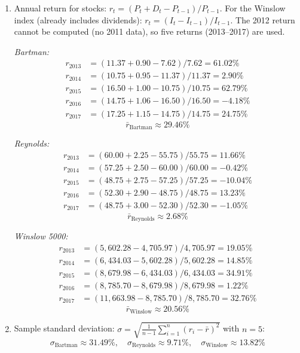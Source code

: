 \documentclass[11pt]{article}
\begin{document}
\begin{enumerate}
  \item[a.] Annual return for stocks: $r_t = (P_t + D_t - P_{t-1}) / P_{t-1}$. For the Winslow index (already includes dividends): $r_t = (I_t - I_{t-1}) / I_{t-1}$. The 2012 return cannot be computed (no 2011 data), so five returns (2013--2017) are used.

    \medskip

    \textit{Bartman:}
    \begin{align*}
      r_{2013} &= (11.37+0.90-7.62)/7.62 = 61.02\%\\
      r_{2014} &= (10.75+0.95-11.37)/11.37 = 2.90\%\\
      r_{2015} &= (16.50+1.00-10.75)/10.75 = 62.79\%\\
      r_{2016} &= (14.75+1.06-16.50)/16.50 = -4.18\%\\
      r_{2017} &= (17.25+1.15-14.75)/14.75 = 24.75\%
    \end{align*}
    \[
      \boxed{\bar{r}_{\text{Bartman}} \approx 29.46\%}
    \]

    \textit{Reynolds:}
    \begin{align*}
      r_{2013} &= (60.00+2.25-55.75)/55.75 = 11.66\%\\
      r_{2014} &= (57.25+2.50-60.00)/60.00 = -0.42\%\\
      r_{2015} &= (48.75+2.75-57.25)/57.25 = -10.04\%\\
      r_{2016} &= (52.30+2.90-48.75)/48.75 = 13.23\%\\
      r_{2017} &= (48.75+3.00-52.30)/52.30 = -1.05\%
    \end{align*}
    \[
      \boxed{\bar{r}_{\text{Reynolds}} \approx 2.68\%}
    \]

    \textit{Winslow 5000:}
    \begin{align*}
      r_{2013} &= (5{,}602.28-4{,}705.97)/4{,}705.97 = 19.05\%\\
      r_{2014} &= (6{,}434.03-5{,}602.28)/5{,}602.28 = 14.85\%\\
      r_{2015} &= (8{,}679.98-6{,}434.03)/6{,}434.03 = 34.91\%\\
      r_{2016} &= (8{,}785.70-8{,}679.98)/8{,}679.98 = 1.22\%\\
      r_{2017} &= (11{,}663.98-8{,}785.70)/8{,}785.70 = 32.76\%
    \end{align*}
    \[
      \boxed{\bar{r}_{\text{Winslow}} \approx 20.56\%}
    \]

  \item[b.] Sample standard deviation: $\sigma = \sqrt{\frac{1}{n-1}\sum_{i=1}^{n}(r_i-\bar{r})^2}$ with $n=5$:
    \[
      \boxed{\sigma_{\text{Bartman}} \approx 31.49\%, \quad \sigma_{\text{Reynolds}} \approx 9.71\%, \quad \sigma_{\text{Winslow}} \approx 13.82\%}
    \]


\end{enumerate}
\end{document}
